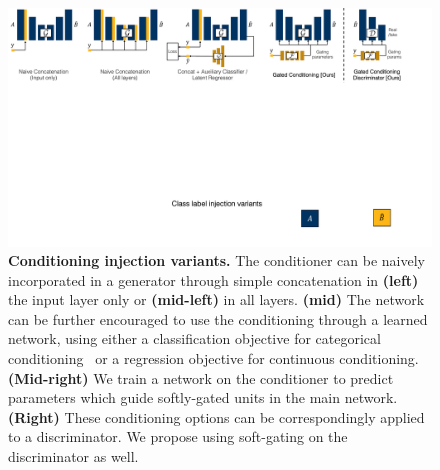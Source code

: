 
\begin{figure}[t]
    \centering
    \includegraphics[width=\linewidth]{paper_images/arch_inject2.pdf}
    \caption{{\bf Conditioning injection variants.}
    The conditioner can be naively incorporated in a generator through simple concatenation in {\bf (left)} the input layer only or {\bf (mid-left)} in all layers. {\bf (mid)} The network can be further encouraged to use the conditioning through a learned network, using either a classification objective for categorical conditioning~\cite{odena2016conditional,chen2016infogan} or a regression objective for continuous conditioning. {\bf (Mid-right)} We train a network on the conditioner to predict parameters which guide softly-gated units in the main network. {\bf (Right)} These conditioning options can be correspondingly applied to a discriminator. We propose using soft-gating on the discriminator as well.\label{fig:arch-inj}
    \vspace{-2mm}
    }
    \vspace{-2mm}
\end{figure}

